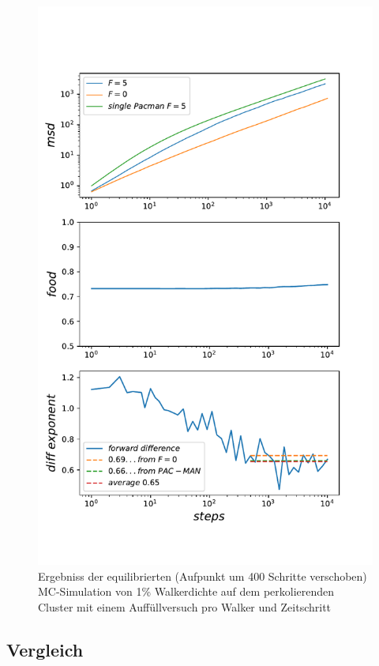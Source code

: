 \documentclass[a4paper, 12pt]{report}
\begin{document}
\begin{figure}[H]
	\centering
	\includegraphics[scale=0.75]{1percent_on_pc_new_food_shifted400_long .pdf}
	\caption{Ergebniss der equilibrierten (Aufpunkt um 400 Schritte verschoben) MC-Simulation von 1\% Walkerdichte auf dem perkolierenden Cluster mit einem Auffüllversuch pro Walker und Zeitschritt}
\end{figure}

\clearpage

\subsection{Vergleich}
\end{document}
